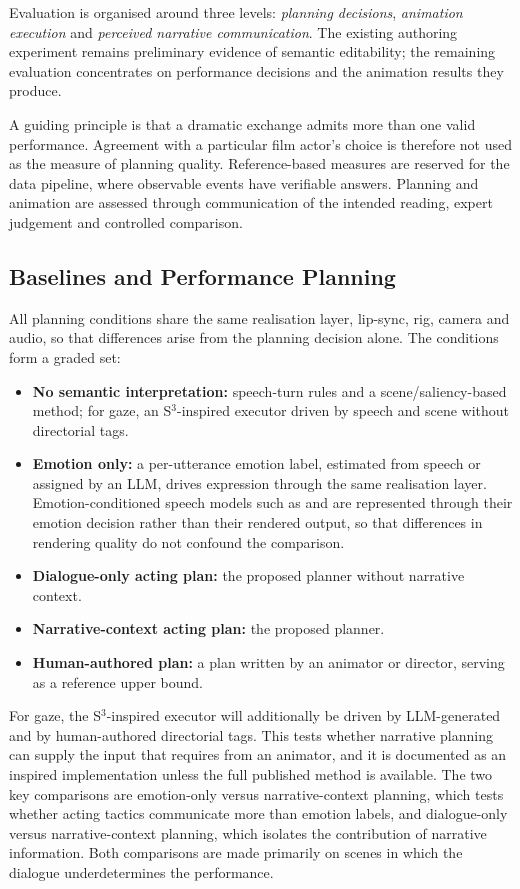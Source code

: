 \documentclass[11pt,a4paper]{article}
\begin{document}
Evaluation is organised around three levels: \emph{planning decisions}, \emph{animation execution} and \emph{perceived narrative communication}. The existing authoring experiment remains preliminary evidence of semantic editability; the remaining evaluation concentrates on performance decisions and the animation results they produce.

A guiding principle is that a dramatic exchange admits more than one valid performance. Agreement with a particular film actor's choice is therefore not used as the measure of planning quality. Reference-based measures are reserved for the data pipeline, where observable events have verifiable answers. Planning and animation are assessed through communication of the intended reading, expert judgement and controlled comparison.

\subsection{Baselines and Performance Planning}

All planning conditions share the same realisation layer, lip-sync, rig, camera and audio, so that differences arise from the planning decision alone. The conditions form a graded set:
\begin{itemize}
\item \textbf{No semantic interpretation:} speech-turn rules and a scene/saliency-based method; for gaze, an S$^3$-inspired executor driven by speech and scene without directorial tags.
\item \textbf{Emotion only:} a per-utterance emotion label, estimated from speech or assigned by an LLM, drives expression through the same realisation layer. Emotion-conditioned speech models such as \citet{peng2023emotalk} and \citet{yang2026destalker} are represented through their emotion decision rather than their rendered output, so that differences in rendering quality do not confound the comparison.
\item \textbf{Dialogue-only acting plan:} the proposed planner without narrative context.
\item \textbf{Narrative-context acting plan:} the proposed planner.
\item \textbf{Human-authored plan:} a plan written by an animator or director, serving as a reference upper bound.
\end{itemize}
For gaze, the S$^3$-inspired executor will additionally be driven by LLM-generated and by human-authored directorial tags. This tests whether narrative planning can supply the input that \citet{pan2024s3} requires from an animator, and it is documented as an inspired implementation unless the full published method is available. The two key comparisons are emotion-only versus narrative-context planning, which tests whether acting tactics communicate more than emotion labels, and dialogue-only versus narrative-context planning, which isolates the contribution of narrative information. Both comparisons are made primarily on scenes in which the dialogue underdetermines the performance.
\end{document}
